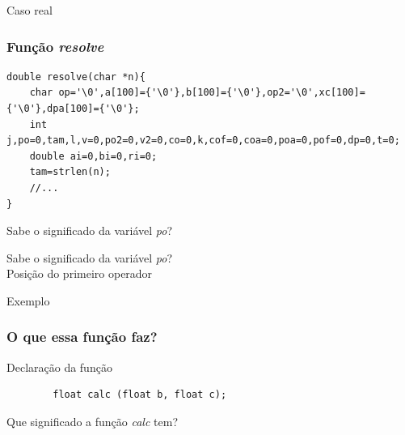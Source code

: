 \begin{frame}
	\Huge Caso real
\end{frame}

\begin{frame}[fragile]
	\frametitle{Função \textit{resolve}}

	\begin{listing}[H]
		\begin{verbatim}
double resolve(char *n){
	char op='\0',a[100]={'\0'},b[100]={'\0'},op2='\0',xc[100]={'\0'},dpa[100]={'\0'};
	int j,po=0,tam,l,v=0,po2=0,v2=0,co=0,k,cof=0,coa=0,poa=0,pof=0,dp=0,t=0;
	double ai=0,bi=0,ri=0;
	tam=strlen(n);
	//...
}
		\end{verbatim}
	\end{listing}
\end{frame}

\begin{frame}[fragile]

	{\Huge Sabe o significado da variável \textit{po}?}

\end{frame}

\begin{frame}[fragile]

	{\Huge Sabe o significado da variável \textit{po}?}\\
	Posição do primeiro operador

\end{frame}

\begin{frame}
	\Huge Exemplo
\end{frame}

\begin{frame}[fragile]
	\frametitle{O que essa função faz?}

	\begin{listing}[H]
		\caption{Declaração da função}
		\begin{verbatim}
		float calc (float b, float c);
	\end{verbatim}
	\end{listing}

\end{frame}

\begin{frame}

	\Huge Que significado a função \textit{calc} tem?

\end{frame}

